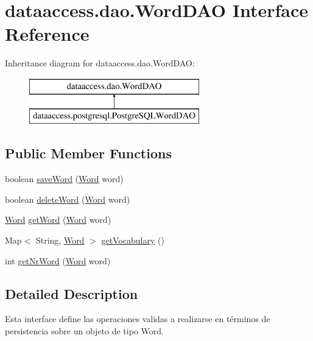 \hypertarget{interfacedataaccess_1_1dao_1_1_word_d_a_o}{\section{dataaccess.\-dao.\-Word\-D\-A\-O \-Interface \-Reference}
\label{interfacedataaccess_1_1dao_1_1_word_d_a_o}
}
\-Inheritance diagram for dataaccess.\-dao.\-Word\-D\-A\-O\-:\begin{figure}[H]
\begin{center}
\leavevmode
\includegraphics[height=2.000000cm]{interfacedataaccess_1_1dao_1_1_word_d_a_o}
\end{center}
\end{figure}
\subsection*{\-Public \-Member \-Functions}
\begin{DoxyCompactItemize}
\item 
boolean \hyperlink{interfacedataaccess_1_1dao_1_1_word_d_a_o_a58adc83c31bbd584aa54cc799cbcdcb6}{save\-Word} (\hyperlink{classcom_1_1utn_1_1searchengine_1_1_word}{\-Word} word)
\item 
boolean \hyperlink{interfacedataaccess_1_1dao_1_1_word_d_a_o_a3f39760cffe5bbc415e4d66ed3cb4a0c}{delete\-Word} (\hyperlink{classcom_1_1utn_1_1searchengine_1_1_word}{\-Word} word)
\item 
\hyperlink{classcom_1_1utn_1_1searchengine_1_1_word}{\-Word} \hyperlink{interfacedataaccess_1_1dao_1_1_word_d_a_o_a6b1f9c2c01db0a4338af7c8496d4f335}{get\-Word} (\hyperlink{classcom_1_1utn_1_1searchengine_1_1_word}{\-Word} word)
\item 
\-Map$<$ \-String, \hyperlink{classcom_1_1utn_1_1searchengine_1_1_word}{\-Word} $>$ \hyperlink{interfacedataaccess_1_1dao_1_1_word_d_a_o_a201645375a5f15c78323ee22e1ac9f69}{get\-Vocabulary} ()
\item 
int \hyperlink{interfacedataaccess_1_1dao_1_1_word_d_a_o_a0caeb4a8ca92a11788e7a53a9791303f}{get\-Nr\-Word} (\hyperlink{classcom_1_1utn_1_1searchengine_1_1_word}{\-Word} word)
\end{DoxyCompactItemize}


\subsection{\-Detailed \-Description}
\-Esta interface define las operaciones validas a realizarse en términos de persistencia sobre un objeto de tipo \-Word.

